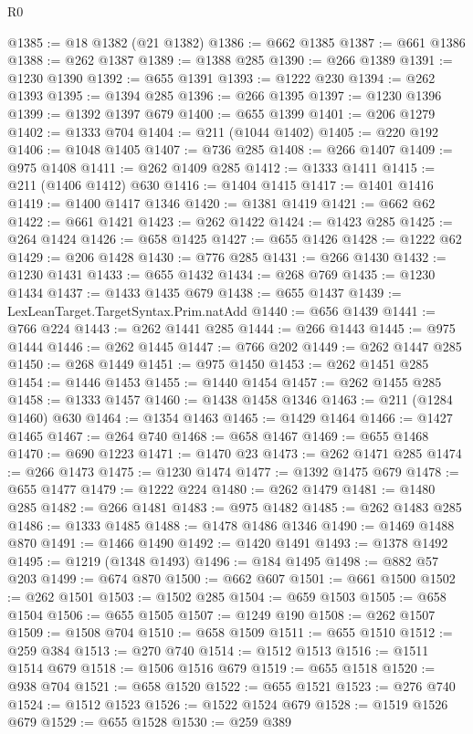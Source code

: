 \begin{lexlean}{R0}
\begin{coremodule}
@1385 := @18 @1382 (@21 @1382)
@1386 := @662 @1385
@1387 := @661 @1386
@1388 := @262 @1387
@1389 := @1388 @285
@1390 := @266 @1389
@1391 := @1230 @1390
@1392 := @655 @1391
@1393 := @1222 @230
@1394 := @262 @1393
@1395 := @1394 @285
@1396 := @266 @1395
@1397 := @1230 @1396
@1399 := @1392 @1397 @679
@1400 := @655 @1399
@1401 := @206 @1279
@1402 := @1333 @704
@1404 := @211 (@1044 @1402)
@1405 := @220 @192
@1406 := @1048 @1405
@1407 := @736 @285
@1408 := @266 @1407
@1409 := @975 @1408
@1411 := @262 @1409 @285
@1412 := @1333 @1411
@1415 := @211 (@1406 @1412) @630
@1416 := @1404 @1415
@1417 := @1401 @1416
@1419 := @1400 @1417 @1346
@1420 := @1381 @1419
@1421 := @662 @62
@1422 := @661 @1421
@1423 := @262 @1422
@1424 := @1423 @285
@1425 := @264 @1424
@1426 := @658 @1425
@1427 := @655 @1426
@1428 := @1222 @62
@1429 := @206 @1428
@1430 := @776 @285
@1431 := @266 @1430
@1432 := @1230 @1431
@1433 := @655 @1432
@1434 := @268 @769
@1435 := @1230 @1434
@1437 := @1433 @1435 @679
@1438 := @655 @1437
@1439 := LexLeanTarget.TargetSyntax.Prim.natAdd
@1440 := @656 @1439
@1441 := @766 @224
@1443 := @262 @1441 @285
@1444 := @266 @1443
@1445 := @975 @1444
@1446 := @262 @1445
@1447 := @766 @202
@1449 := @262 @1447 @285
@1450 := @268 @1449
@1451 := @975 @1450
@1453 := @262 @1451 @285
@1454 := @1446 @1453
@1455 := @1440 @1454
@1457 := @262 @1455 @285
@1458 := @1333 @1457
@1460 := @1438 @1458 @1346
@1463 := @211 (@1284 @1460) @630
@1464 := @1354 @1463
@1465 := @1429 @1464
@1466 := @1427 @1465
@1467 := @264 @740
@1468 := @658 @1467
@1469 := @655 @1468
@1470 := @690 @1223
@1471 := @1470 @23
@1473 := @262 @1471 @285
@1474 := @266 @1473
@1475 := @1230 @1474
@1477 := @1392 @1475 @679
@1478 := @655 @1477
@1479 := @1222 @224
@1480 := @262 @1479
@1481 := @1480 @285
@1482 := @266 @1481
@1483 := @975 @1482
@1485 := @262 @1483 @285
@1486 := @1333 @1485
@1488 := @1478 @1486 @1346
@1490 := @1469 @1488 @870
@1491 := @1466 @1490
@1492 := @1420 @1491
@1493 := @1378 @1492
@1495 := @1219 (@1348 @1493)
@1496 := @184 @1495
@1498 := @882 @57 @203
@1499 := @674 @870
@1500 := @662 @607
@1501 := @661 @1500
@1502 := @262 @1501
@1503 := @1502 @285
@1504 := @659 @1503
@1505 := @658 @1504
@1506 := @655 @1505
@1507 := @1249 @190
@1508 := @262 @1507
@1509 := @1508 @704
@1510 := @658 @1509
@1511 := @655 @1510
@1512 := @259 @384
@1513 := @270 @740
@1514 := @1512 @1513
@1516 := @1511 @1514 @679
@1518 := @1506 @1516 @679
@1519 := @655 @1518
@1520 := @938 @704
@1521 := @658 @1520
@1522 := @655 @1521
@1523 := @276 @740
@1524 := @1512 @1523
@1526 := @1522 @1524 @679
@1528 := @1519 @1526 @679
@1529 := @655 @1528
@1530 := @259 @389

\end{coremodule}
\end{lexlean}
